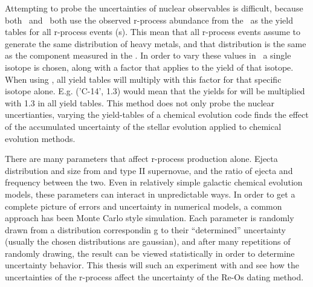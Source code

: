 Attempting to probe the uncertainties of nuclear observables is difficult, because both \eris\ and \omegamodel\ both use the observed r-process abundance from the \sos\ as the yield tables for all r-process events (\nsm\-s). This mean that all r-process events assume to generate the same distribution of heavy metals, and that distribution is the same as the component measured in the \sos.
In order to vary these values in \omegamodel\ a single isotope is chosen, along with a factor that applies to the yield of that isotope. When using \omegamodel, all yield tables will multiply with this factor for that specific isotope alone. E.g. ('C-14', 1.3) would mean that the yields for  will be multiplied with 1.3 in all yield tables.
This method does not only probe the nuclear uncertianties, varying the yield-tables of a chemical evolution code finds the effect of the accumulated uncertainty of the stellar evolution applied to chemical evolution methods.

There are many parameters that affect r-process production alone. Ejecta distribution and size from \nsm and type II supernovae, and the ratio of ejecta and frequency between the two. Even in relatively simple galactic chemical evolution models, these parameters can interact in unpredictable ways. In order to get a complete picture of errors and uncertainty in numerical models, a common approach has been Monte Carlo style simulation. Each parameter is randomly drawn from a distribution correspondin g to their ``determined'' uncertainty (usually the chosen distributions are gaussian), and after many repetitions of randomly drawing, the result can be viewed statistically in order to determine uncertainty behavior.
This thesis will such an experiment with  and see how the uncertainties of the r-process affect the uncertainty of the Re-Os dating method.

\iffalse

\section{fitting}

\section{impact of stellar yields}


\fi

